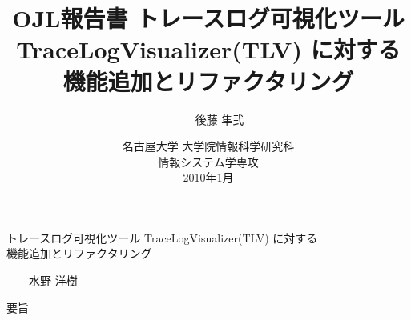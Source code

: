 \documentclass[a4paper,12pt]{jarticle}
\title{
{\LARGE\sffamily\gtfamily
OJL報告書
}
\vspace*{.6in}
{\huge\sffamily\gtfamily
トレースログ可視化ツール TraceLogVisualizer(TLV) に対する機能追加とリファクタリング
}
\vfill\vfill\vfill
}
\author{
\LARGE\sffamily\gtfamily
350702101\ \ \ \ 後藤 隼弐\\
}
\date{
\vfill
\Large\sffamily\gtfamily
名古屋大学 大学院情報科学研究科\\[.2in]
情報システム学専攻\\[.2in]
2010年1月
\vfill
}\renewcommand{\baselinestretch}{1}
\begin{document}
\def\thesection{\large\arabic{section}}
\newcommand{\mysection}[1]{\vspace{-2zh}\section{\large #1}\vspace{-0.5zh}}

\newcommand{\step}[1]{\textbf{#1} }

\pagestyle{empty}
\vspace*{-1in}
\begin{center}
\large\sffamily\gtfamily トレースログ可視化ツール TraceLogVisualizer(TLV) に対する\\
機能追加とリファクタリング
\end{center}
\begin{flushright}
\large\sffamily{}\ \ \ \ 水野 洋樹
\end{flushright}
\begin{center}
\large\sffamily\gtfamily 要旨
\end{center}
\end{document}
